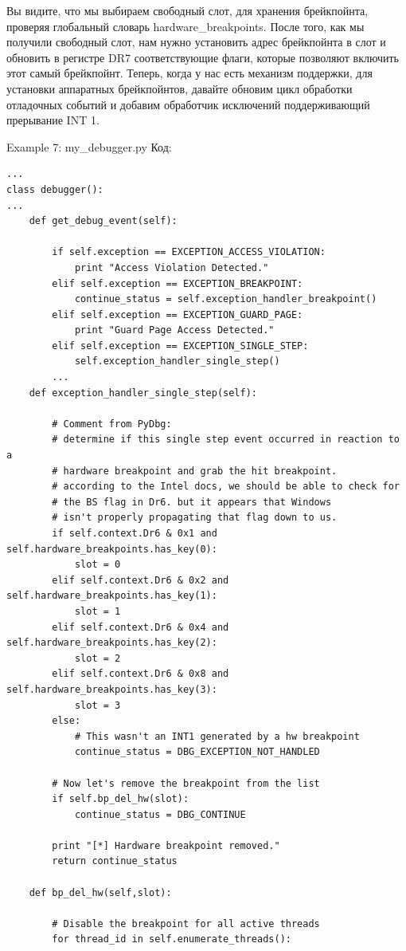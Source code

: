 \documentclass[12pt]{book}
\begin{document}
Вы видите, что мы выбираем свободный слот, для хранения брейкпойнта, проверяя глобальный словарь hardware\_breakpoints. После того, как мы получили свободный слот, нам нужно установить адрес брейкпойнта в слот и обновить в регистре DR7 соответствующие флаги, которые позволяют включить этот самый брейкпойнт. Теперь, когда у нас есть механизм поддержки, для установки аппаратных брейкпойнтов, давайте обновим цикл обработки отладочных событий и добавим обработчик исключений поддерживающий прерывание INT 1.

Example 7: my\_debugger.py
Код:
\begin{lstlisting}
...
class debugger():
...
    def get_debug_event(self):

        if self.exception == EXCEPTION_ACCESS_VIOLATION:
            print "Access Violation Detected."
        elif self.exception == EXCEPTION_BREAKPOINT:
            continue_status = self.exception_handler_breakpoint()
        elif self.exception == EXCEPTION_GUARD_PAGE:
            print "Guard Page Access Detected."
        elif self.exception == EXCEPTION_SINGLE_STEP:
            self.exception_handler_single_step()
        ...
    def exception_handler_single_step(self):

        # Comment from PyDbg:
        # determine if this single step event occurred in reaction to a
        # hardware breakpoint and grab the hit breakpoint.
        # according to the Intel docs, we should be able to check for
        # the BS flag in Dr6. but it appears that Windows
        # isn't properly propagating that flag down to us.
        if self.context.Dr6 & 0x1 and self.hardware_breakpoints.has_key(0):
            slot = 0
        elif self.context.Dr6 & 0x2 and self.hardware_breakpoints.has_key(1):
            slot = 1
        elif self.context.Dr6 & 0x4 and self.hardware_breakpoints.has_key(2):
            slot = 2
        elif self.context.Dr6 & 0x8 and self.hardware_breakpoints.has_key(3):
            slot = 3
        else:
            # This wasn't an INT1 generated by a hw breakpoint
            continue_status = DBG_EXCEPTION_NOT_HANDLED

        # Now let's remove the breakpoint from the list
        if self.bp_del_hw(slot):
            continue_status = DBG_CONTINUE

        print "[*] Hardware breakpoint removed."
        return continue_status

    def bp_del_hw(self,slot):

        # Disable the breakpoint for all active threads
        for thread_id in self.enumerate_threads():


\end{lstlisting}
\end{document}
